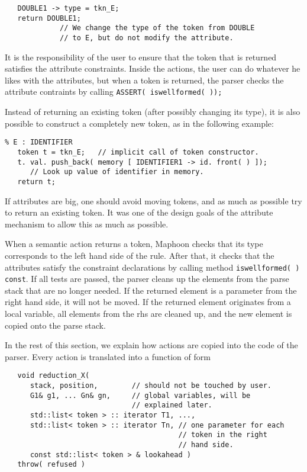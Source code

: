 \documentclass{article}
\begin{document}
\begin{enumerate}
\begin{verbatim}
   DOUBLE1 -> type = tkn_E;
   return DOUBLE1;     
             // We change the type of the token from DOUBLE 
             // to E, but do not modify the attribute. 
\end{verbatim}
   It is the responsibility of the user to ensure that the
   token that is returned satisfies the attribute constraints. Inside
   the actions, the user can do whatever he likes with the attributes,
   but when a token is returned, the parser
   checks the attribute contraints by calling 
   \verb+ASSERT( iswellformed( ));+

   \noindent
   Instead of returning an existing token (after possibly changing its type),
   it is also possible to construct a completely new token, as in
   the following example:
\begin{verbatim}
% E : IDENTIFIER
   token t = tkn_E;   // implicit call of token constructor. 
   t. val. push_back( memory [ IDENTIFIER1 -> id. front( ) ]);
      // Look up value of identifier in memory. 
   return t;
\end{verbatim}

   \noindent  
   If attributes are big, one should avoid moving tokens, and
   as much as possible try to return an existing token. 
   It was one of the design goals of the attribute mechanism to 
   allow this as much as possible. 

\end{enumerate}


   
\noindent
When a semantic action returns a token, Maphoon checks that its type
corresponds to the left hand side of the
rule. After that, it checks that the attributes satisfy the constraint
declarations by calling method
\verb+iswellformed( ) const+. If all tests
are passed, the parser cleans up the
elements from the parse stack that are no longer needed. 
If the returned element is a parameter from
the right hand side, it will not be moved. 
If the returned element originates from
a local variable, all elements from the rhs are cleaned up,
and the new element is copied onto the parse stack.


In the rest of this section, we explain how actions are 
copied into the code of the parser. 
Every action is translated into a function of form

\begin{verbatim}
   void reduction_X( 
      stack, position,        // should not be touched by user. 
      G1& g1, ... Gn& gn,     // global variables, will be 
                              // explained later. 
      std::list< token > :: iterator T1, ...,
      std::list< token > :: iterator Tn, // one parameter for each 
                                         // token in the right 
                                         // hand side.
      const std::list< token > & lookahead ) 
   throw( refused )
\end{verbatim}
\end{document}
